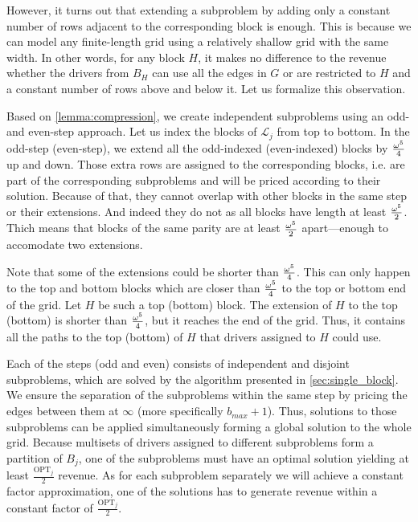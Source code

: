 However, it turns out that extending a subproblem by adding only a constant number of rows adjacent to the corresponding block is enough.
This is because we can model any finite-length grid using a relatively shallow grid with the same width.
In other words, for any block $H$, it makes no difference to the revenue whether the drivers from $B_H$ can use all the edges in $G$
or are restricted to $H$ and a constant number of rows above and below it.
Let us formalize this observation.



Based on \cref{lemma:compression}, we create independent subproblems using an odd- and even-step approach.
Let us index the blocks of $\mathcal{L}_j$ from top to bottom.
In the odd-step (even-step), we extend all the odd-indexed (even-indexed) blocks by $\frac{\omega^5}{4}$ up and down.
Those extra rows are assigned to the corresponding blocks, i.e. are part of the corresponding subproblems and will be priced according to their solution.
Because of that, they cannot overlap with other blocks in the same step or their extensions.
And indeed they do not as all blocks have length at least $\frac{\omega^5}{2}$.
Thich means that blocks of the same parity are at least $\frac{\omega^5}{2}$ apart---enough to accomodate two
extensions.

Note that some of the extensions could be shorter than $\frac{\omega^5}{4}$.
This can only happen to the top and bottom blocks which are closer than $\frac{\omega^5}{4}$ to the top or bottom end of the grid.
Let $H$ be such a top (bottom) block.
The extension of $H$ to the top (bottom) is shorter than $\frac{\omega^5}{4}$, but it reaches the end of the grid.
Thus, it contains all the paths to the top (bottom) of $H$ that drivers assigned to $H$ could use.

Each of the steps (odd and even) consists of independent and disjoint subproblems,
which are solved by the algorithm presented in \cref{sec:single_block}.
We ensure the separation of the subproblems within the same step by pricing the edges between them at $\infty$ (more specifically $b_{max} + 1$).
Thus, solutions to those subproblems can be applied simultaneously forming a global solution to the whole grid.
Because multisets of drivers assigned to different subproblems form a partition of $B_j$,
one of the subproblems must have an optimal solution yielding at least $\frac{\mathrm{OPT}_j}{2}$ revenue.
As for each subproblem separately we will achieve a constant factor approximation,
one of the solutions has to generate revenue within a constant factor of $\frac{\mathrm{OPT}_j}{2}$.

